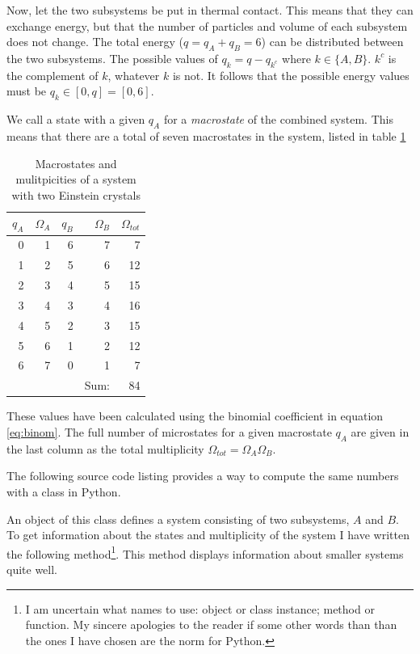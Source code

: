 \documentclass[10pt,a4paper]{amsart}
\begin{document}
Now, let the two subsystems be put in thermal contact. This means that they can exchange energy, but that the number of particles and volume of each subsystem does not change. The total energy ($q=q_A+q_B=6$) can be distributed between the two subsystems. The possible values of $q_k=q-q_{k^c}$ where $k \in \{A,B\}$. $k^c$ is the complement of $k$, whatever $k$ is not. It follows that the possible energy values must be $q_k \in [0,q]=[0,6]$.

We call a state with a given $q_A$ for a \emph{macrostate} of the combined system. This means that there are a total of seven macrostates in the system, listed in table \ref{tab:einsteinmacro}

\begin{table}[h]
\caption{Macrostates and mulitpicities of a system with two Einstein crystals}
\begin{tabular}{rrrrr} \hline
 $q_A$ & $\Omega_A$ & $q_B$ & $\Omega_B$ & $\Omega_{tot}$ \\ \hline
    0  &  1 &  6  &  7   &   7 \\
    1  &  2 &  5  &  6   &  12 \\
    2  &  3 &  4  &  5   &  15 \\
    3  &  4 &  3  &  4   &  16 \\
    4  &  5 &  2  &  3   &  15 \\
    5  &  6 &  1  &  2   &  12 \\
    6  &  7 &  0  &  1   &   7 \\ \hline
       &    &     & Sum: &  84 \\ \hline  
\end{tabular}
\label{tab:einsteinmacro}
\end{table}
These values have been calculated using the binomial coefficient in equation \ref{eq:binom}. The full number of microstates for a given macrostate $q_A$ are given in the last column as the total multiplicity $\Omega_{tot}=\Omega_A\Omega_B$.

The following source code listing provides a way to compute the same numbers with a class in Python.



An object of this class defines a system consisting of two subsystems, $A$ and $B$. To get information about the states and multiplicity of the system I have written the following method\footnote{I am uncertain what names to use: object or class instance; method or function. My sincere apologies to the reader if some other words than than the ones I have chosen are the norm for Python.}. This method displays information about smaller systems quite well.
\end{document}
